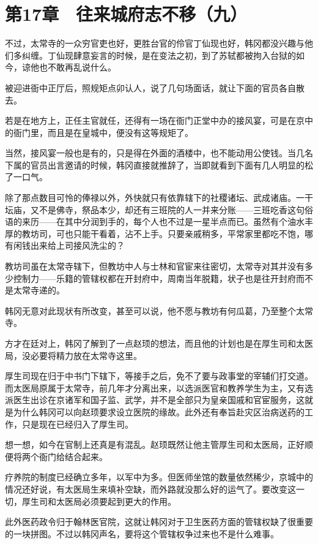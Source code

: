 \section{第17章　往来城府志不移（九）}

不过，太常寺的一众穷官吏也好，更胜台官的伶官丁仙现也好，韩冈都没兴趣与他们多纠缠。丁仙现肆意妄言的时候，是在变法之初，到了苏轼都被拘入台狱的如今，谅他也不敢再乱说什么。

被迎进衙中正厅后，照规矩点卯认人，说了几句场面话，就让下面的官员各自散去。

若是在地方上，正任主官就任，还得有一场在衙门正堂中办的接风宴，可是在京中的衙门里，而且是在皇城中，便没有这等规矩了。

当然，接风宴一般也是有的，只是得在外面的酒楼中，也不能动用公使钱。当几名下属的官员出言邀请的时候，韩冈直接就推辞了，当即就看到下面有几人明显的松了一口气。

除了那点数目可怜的俸禄以外，外快就只有依靠辖下的社稷诸坛、武成诸庙。一干坛庙，又不是佛寺，祭品本少，却还有三班院的人一并来分账——三班吃香这句俗语的来历——在其中分润到手的，每个人也不过是一星半点而已。虽然有个油水丰厚的教坊司，可也只能干看着，沾不上手。只要亲戚稍多，平常家里都吃不饱，哪有闲钱出来给上司接风洗尘的？

教坊司虽在太常寺辖下，但教坊中人与士林和官宦来往密切，太常寺对其并没有多少控制力——乐籍的管辖权都在开封府中，周南当年脱籍，状子也是往开封府而不是太常寺递的。

韩冈无意对此现状有所改变，甚至可以说，他不愿与教坊有何瓜葛，乃至整个太常寺。

方才在廷对上，韩冈了解到了一点赵顼的想法，而且他的计划也是在厚生司和太医局，没必要将精力放在太常寺这里。

厚生司现在归于中书门下辖下，等接手之后，免不了要与政事堂的宰辅们打交道。而太医局原属于太常寺，前几年才分离出来，以选派医官和教养学生为主，又有选派医生出诊在京诸军和国子监、武学，并不是全部只为皇亲国戚和官宦服务，这就是为什么韩冈可以向赵顼要求设立医院的缘故。此外还有奉旨赴灾区治病送药的工作，只是现在已经归入了厚生司。

想一想，如今在官制上还真是有混乱。赵顼既然让他主管厚生司和太医局，正好顺便将两个衙门给结合起来。

疗养院的制度已经确立多年，以军中为多。但医师坐馆的数量依然稀少，京城中的情况还好说，有太医局生来填补空缺，而外路就没那么好的运气了。要改变这一切，厚生司和太医局必须要起到更大的作用。

此外医药政令归于翰林医官院，这就让韩冈对于卫生医药方面的管辖权缺了很重要的一块拼图。不过以韩冈声名，要将这个管辖权争过来也不是什么难事。

